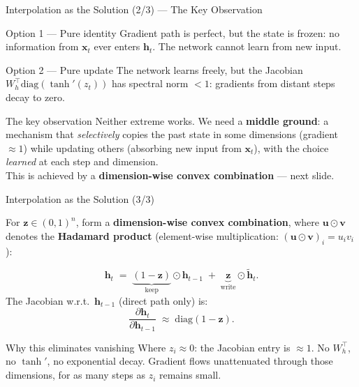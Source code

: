 \documentclass[aspectratio=169]{beamer}
\begin{document}
\begin{frame}{Interpolation as the Solution (2/3) — The Key Observation}
\small
\begin{block}{Option 1 — Pure identity}
  Gradient path is perfect, but the state is frozen: no information from $\boldsymbol{x}_t$ ever
  enters $\boldsymbol{h}_t$. The network cannot learn from new input.
\end{block}

\begin{alertblock}{Option 2 — Pure update}
  The network learns freely, but the Jacobian $W_h^{\top}\mathrm{diag}(\tanh'(z_t))$
  has spectral norm $< 1$: gradients from distant steps decay to zero.
\end{alertblock}
\normalsize
\begin{block}{The key observation}
  Neither extreme works. We need a \textbf{middle ground}: a mechanism that
  \emph{selectively} copies the past state in some dimensions (gradient $\approx 1$)
  while updating others (absorbing new input from $\boldsymbol{x}_t$),
  with the choice \emph{learned} at each step and dimension.\\[3pt]
  This is achieved by a \textbf{dimension-wise convex combination} — next slide.
\end{block}

\end{frame}
%
%
\begin{frame}{Interpolation as the Solution (3/3)}

For $\boldsymbol{z} \in (0,1)^n$, form a \textbf{dimension-wise convex combination},
where $\boldsymbol{u} \odot \boldsymbol{v}$ denotes the \textbf{Hadamard product}
(element-wise multiplication: $(\boldsymbol{u} \odot \boldsymbol{v})_i = u_i v_i$):

\[
  \boldsymbol{h}_t \;=\;
  \underbrace{(1 - \boldsymbol{z})}_{\text{keep}} \odot \boldsymbol{h}_{t-1}
  \;+\;
  \underbrace{\boldsymbol{z}}_{\text{write}} \odot \tilde{\boldsymbol{h}}_t.
\]
The Jacobian w.r.t.\ $\boldsymbol{h}_{t-1}$ (direct path only) is:
\[
  \frac{\partial \boldsymbol{h}_t}{\partial \boldsymbol{h}_{t-1}}
  \;\approx\; \mathrm{diag}(1 - \boldsymbol{z}).
\]

\begin{alertblock}{Why this eliminates vanishing}
  \small
  Where $z_i \approx 0$: the Jacobian entry is $\approx 1$. No $W_h^{\top}$, no $\tanh'$,
  no exponential decay. Gradient flows unattenuated through those dimensions,
  for as many steps as $z_i$ remains small.
\end{alertblock}

\end{frame}
\end{document}
